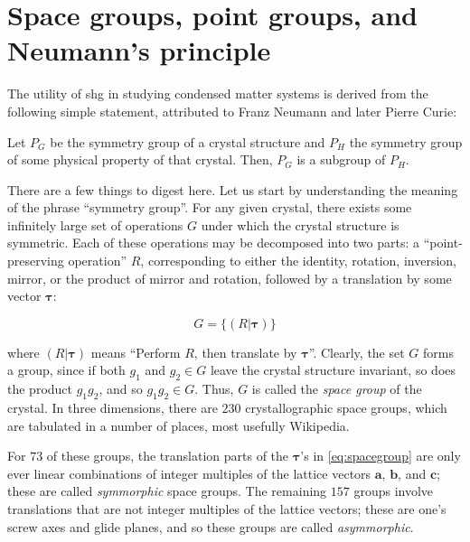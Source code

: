 \section{Space groups, point groups, and Neumann's principle}\label{sec:neumann}

The utility of \gls{shg} in studying condensed matter systems is derived from the following simple statement, attributed to Franz Neumann\citep{neumann_vorlesungen_1885} and later Pierre Curie\citep{curie_sur_1894}:

\begin{theorem}\label{thm:neumann}
Let $P_G$ be the symmetry group of a crystal structure and $P_H$ the symmetry group of some physical property of that crystal.
Then, $P_G$ is a subgroup of $P_H$.
\end{theorem}

There are a few things to digest here.
Let us start by understanding the meaning of the phrase ``symmetry group''.
For any given crystal, there exists some infinitely large set of operations $G$ under which the crystal structure is symmetric.
Each of these operations may be decomposed into two parts: a ``point-preserving operation'' $R$, corresponding to either the identity, rotation, inversion, mirror, or the product of mirror and rotation, followed by a translation by some vector $\bm{\tau}$:

\begin{equation}\label{eq:spacegroup}
G = \{(R|\bm{\tau})\}
\end{equation}

where $(R|\bm{\tau})$ means ``Perform $R$, then translate by $\bm{\tau}$''.
Clearly, the set $G$ forms a group, since if both $g_1$ and $g_2 \in G$ leave the crystal structure invariant, so does the product $g_1g_2$, and so $g_1g_2 \in G$.
Thus, $G$ is called the \emph{space group} of the crystal.
In three dimensions, there are $230$ crystallographic space groups, which are tabulated in a number of places, most usefully Wikipedia\citep{wiki:spacegroups}.

For $73$ of these groups, the translation parts of the $\bm{\tau}$'s in \cref{eq:spacegroup} are only ever linear combinations of integer multiples of the lattice vectors $\bm{a}$, $\bm{b}$, and $\bm{c}$; these are called \emph{symmorphic} space groups.
The remaining $157$ groups involve translations that are not integer multiples of the lattice vectors; these are one's screw axes and glide planes, and so these groups are called \emph{asymmorphic}.

